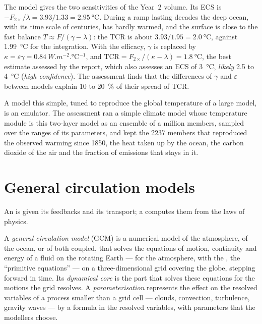 The model gives the two sensitivities of the Year~2 volume. Its ECS is
$-F_{2\times}/\lambda = 3.93/1.33 = \qty{2.95}{\celsius}$. During a ramp
lasting decades the deep ocean, with its time scale of centuries, has hardly
warmed, and the surface is close to the fast balance $T \approx F/(\gamma -
\lambda)$: the TCR is about $3.93/1.95 = \qty{2.0}{\celsius}$, against
\qty{1.99}{\celsius} for the integration. With the efficacy, $\gamma$ is
replaced by $\kappa = \varepsilon\gamma = \qty{0.84}{W.m^{-2}.\celsius^{-1}}$,
and $\text{TCR} = F_{2\times}/(\kappa - \lambda) = \qty{1.8}{\celsius}$,
the best estimate assessed by the report, which also assesses an ECS of
\qty{3}{\celsius}, \emph{likely} 2.5 to \qty{4}{\celsius} (\emph{high
confidence}). The assessment finds that the differences of $\gamma$ and
$\varepsilon$ between models explain 10 to \qty{20}{\percent} of their
spread of TCR.

A model this simple, tuned to reproduce the global temperature of a large
model, is an emulator. The assessment ran a simple climate model whose temperature module is
this two-layer model as an ensemble of a million members, sampled over the
ranges of its parameters, and kept the 2237 members that reproduced the
observed warming since 1850, the heat taken up by the ocean, the carbon
dioxide of the air and the fraction of emissions that stays in it.

\section{General circulation models}\label{sec:b3:climate-models:gcm}

An  is given its feedbacks and its transport; a
 computes them from the laws of physics.

\begin{definition}\label{def:b3:climate-models:gcm}
A \emph{general circulation model} (GCM)
is a numerical model of the atmosphere, of the ocean, or of both coupled,
that solves the equations of motion, continuity and energy of a fluid on
the rotating Earth --- for the atmosphere, with the , the ``primitive equations'' --- on a three-dimensional
grid covering the globe, stepping forward in time. Its \emph{dynamical
core} is the part that solves these equations for
the motions the grid resolves. A
\emph{parameterisation} represents the effect on
the resolved variables of a process smaller than a grid cell --- clouds,
convection, turbulence, gravity waves --- by a formula in the resolved
variables, with parameters that the modellers choose.
\end{definition}

